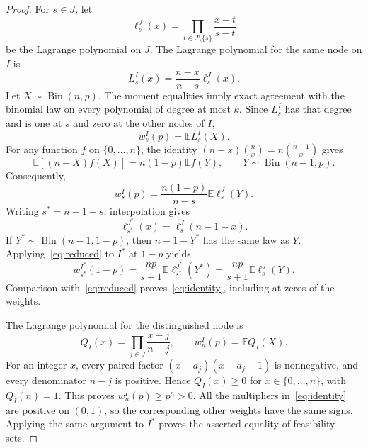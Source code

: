 \documentclass[10pt,a4paper]{amsart}
\newcommand{\E}{\mathbb E}
\newcommand{\Bin}{\operatorname{Bin}}
\begin{document}
\begin{proof}
For $s\in J$, let
\[
 \ell_s^J(x)=\prod_{t\in J\setminus\{s\}}\frac{x-t}{s-t}
\]
be the Lagrange polynomial on $J$. The Lagrange polynomial for the same node on $I$ is
\begin{equation}\label{eq:lagrange}
 L_s^I(x)=\frac{n-x}{n-s}\ell_s^J(x).
\end{equation}
Let $X\sim\Bin(n,p)$. The moment equalities imply exact agreement with the binomial law on every polynomial of degree at most $k$. Since $L_s^I$ has that degree and is one at $s$ and zero at the other nodes of $I$,
\begin{equation}\label{eq:expectation}
 w_s^I(p)=\E L_s^I(X).
\end{equation}
For any function $f$ on $\{0,\ldots,n\}$, the identity
$(n-x)\binom{n}{x}=n\binom{n-1}{x}$ gives
\begin{equation}\label{eq:reweight}
 \E[(n-X)f(X)]=n(1-p)\E f(Y),\qquad Y\sim\Bin(n-1,p).
\end{equation}
Consequently,
\begin{equation}\label{eq:reduced}
 w_s^I(p)=\frac{n(1-p)}{n-s}\E\ell_s^J(Y).
\end{equation}
Writing $s^*=n-1-s$, interpolation gives
\[
 \ell_{s^*}^{J^*}(x)=\ell_s^J(n-1-x).
\]
If $Y^*\sim\Bin(n-1,1-p)$, then $n-1-Y^*$ has the same law as $Y$. Applying~\eqref{eq:reduced} to $I^*$ at $1-p$ yields
\[
 w_{s^*}^{I^*}(1-p)
 =\frac{np}{s+1}\E\ell_{s^*}^{J^*}(Y^*)
 =\frac{np}{s+1}\E\ell_s^J(Y).
\]
Comparison with~\eqref{eq:reduced} proves~\eqref{eq:identity}, including at zeros of the weights.

The Lagrange polynomial for the distinguished node is
\begin{equation}\label{eq:dual}
 Q_I(x)=\prod_{j\in J}\frac{x-j}{n-j},\qquad
 w_n^I(p)=\E Q_I(X).
\end{equation}
For an integer $x$, every paired factor $(x-a_j)(x-a_j-1)$ is nonnegative, and every denominator $n-j$ is positive. Hence $Q_I(x)\ge0$ for $x\in\{0,\ldots,n\}$, with $Q_I(n)=1$. This proves $w_n^I(p)\ge p^n>0$.
All the multipliers in~\eqref{eq:identity} are positive on $(0,1)$, so the corresponding other weights have the same signs. Applying the same argument to $I^*$ proves the asserted equality of feasibility sets.
\end{proof}
\end{document}
